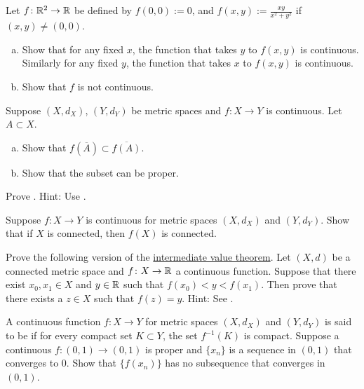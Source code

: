 \begin{exercise} \label{exercise:dicontR2}
Let $f \colon {\mathbb{R}}^2 \to {\mathbb{R}}$ be defined by $f(0,0) := 0$, and
$f(x,y) := \frac{xy}{x^2+y^2}$ if $(x,y) \not= (0,0)$.
\begin{enumerate}[a)]
\item
Show that for any fixed $x$,
the function that takes $y$ to $f(x,y)$ is continuous.  Similarly
for any fixed $y$, the function that takes $x$ to $f(x,y)$ is continuous.
\item
Show that $f$ is not continuous.
\end{enumerate}
\end{exercise}

\begin{exercise} 
Suppose $(X,d_X)$, $(Y,d_Y)$ be metric spaces and
$f \colon X \to Y$ is continuous.
Let $A \subset X$.
\begin{enumerate}[a)]
\item
Show that $f(\overline{A}) \subset \overline{f(A)}$.
\item
Show that the subset can be proper.
\end{enumerate}
\end{exercise}

\begin{exercise}
Prove .  Hint: Use .
\end{exercise}

\begin{exercise} \label{exercise:msconnconn}
Suppose $f \colon X \to Y$ is continuous for metric spaces $(X,d_X)$
and $(Y,d_Y)$.  Show that if $X$ is connected, then $f(X)$ is connected.
\end{exercise}

\begin{exercise}
Prove the following version of the
\hyperref[IVT:thm]{intermediate value theorem}.  Let $(X,d)$ be a connected
metric space and $f \colon X \to {\mathbb{R}}$ a continuous function.  Suppose that
there exist $x_0,x_1 \in X$ and $y \in {\mathbb{R}}$ such that $f(x_0) < y < f(x_1)$.
Then prove that there exists a $z \in X$ such that $f(z) = y$.
Hint: See .
\end{exercise}

\begin{exercise}
A continuous function $f \colon X \to Y$ for metric spaces $(X,d_X)$ and
$(Y,d_Y)$ is said to be \emph{}
if for every compact set $K \subset Y$, the set $f^{-1}(K)$ is compact.
Suppose a continuous $f \colon (0,1) \to (0,1)$ is proper and $\{ x_n
\}$ is a sequence in $(0,1)$ that converges to $0$.  Show that
$\{ f(x_n) \}$ has no subsequence that converges in $(0,1)$.
\end{exercise}


